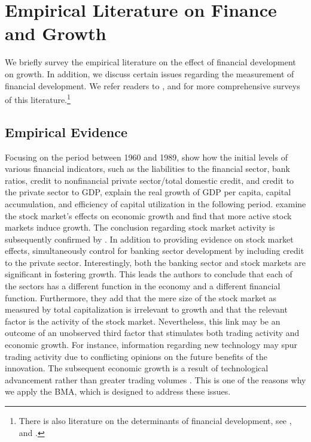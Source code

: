 \section{Empirical Literature on Finance and Growth}
\label{ch2sec:litsurvey}

We briefly survey the empirical literature on the effect of financial development on growth. In addition, we discuss certain issues regarding the measurement of financial development. We refer readers to \citet{Levine2005}, \citet{Ang2008} and \citet{Valickovaetal2014} for more comprehensive surveys of this literature.\footnote{There is also literature on the determinants of financial development, see \citet{Ang2013}, and \citet{angkumar}.}

\subsection{Empirical Evidence}

Focusing on the period between 1960 and 1989, \citet{KingLevine1993a} show how the initial levels of various financial indicators, such as the liabilities to the financial sector, bank ratios, credit to nonfinancial private sector/total domestic credit, and credit to the private sector to GDP, explain the real growth of GDP per capita, capital accumulation, and efficiency of capital utilization in the following period. \citet{AtjeJovanovich1993} examine the stock market's effects on economic growth and find that more active stock markets induce growth. The conclusion regarding stock market activity is subsequently confirmed by \citet{LevineZervos1998}. In addition to providing evidence on stock market effects, \citet{LevineZervos1998} simultaneously control for banking sector development by including credit to the private sector. Interestingly, both the banking sector and stock markets are significant in fostering growth. This leads the authors to conclude that each of the sectors has a different function in the economy and a different financial function. Furthermore, they add that the mere size of the stock market as measured by total capitalization is irrelevant to growth and that the relevant factor is the activity of the stock market. Nevertheless, this link may be an outcome of an unobserved third factor that stimulates both trading activity and economic growth. For instance, information regarding new technology may spur trading activity due to conflicting opinions on the future benefits of the innovation. The subsequent economic growth is a result of technological advancement rather than greater trading volumes \citep{Levine2005}. This is one of the reasons why we apply the \ac{BMA}, which is designed to address these issues.

